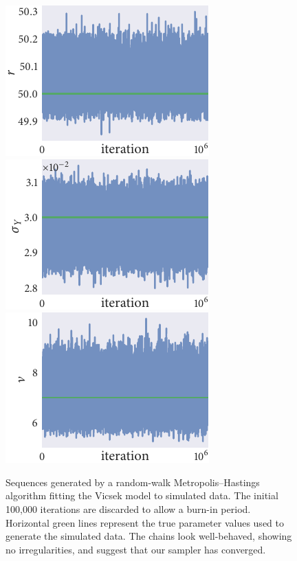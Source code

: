 \begin{figure}[p]
  \includegraphics{r/r_trace_r.pdf}%
  \includegraphics{r/r_trace_sigma_Y.pdf}%
  \includegraphics{r/r_trace_nu.pdf}
  \caption{Sequences generated by a random-walk Metropolis--Hastings algorithm
    fitting the Vicsek model to simulated data. The initial 100,000
    iterations are discarded to allow a burn-in period. Horizontal green
    lines represent the true parameter values used to generate the simulated
    data. The chains look well-behaved, showing no irregularities, and suggest
    that our sampler has converged.}
  \label{fig:vicsek_trace}
\end{figure}%
